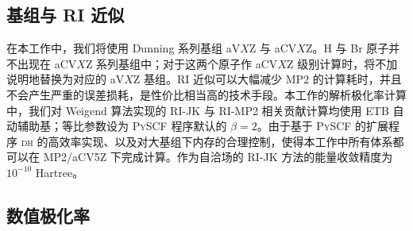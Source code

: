 \subsection{基组与 RI 近似}

在本工作中，我们将使用 Dunning 系列基组 aV$X$Z 与 aCV$X$Z。H 与 Br 原子并不出现在 aCV$X$Z 系列基组中；对于这两个原子作 aCV$X$Z 级别计算时，将不加说明地替换为对应的 aV$X$Z 基组。RI 近似可以大幅减少 MP2 的计算耗时，并且不会产生严重的误差损耗，是性价比相当高的技术手段\cite{Vahtras-Feyereisen.CPL.1993}。本工作的解析极化率计算中，我们对 Weigend 算法实现的 RI-JK\cite{Weigend-Weigend.PCCP.2002} 与 RI-MP2 相关贡献\cite{Weigend-Haettig.JCP.2002}计算均使用 ETB 自动辅助基；等比参数设为 \textsc{PySCF} 程序默认的 $\beta = 2$。由于基于 \textsc{PySCF} 的扩展程序 \textsc{dh} 的高效率实现、以及对大基组下内存的合理控制，使得本工作中所有体系都可以在 MP2/aCV5Z 下完成计算。作为自洽场的 RI-JK 方法的能量收敛精度为 $10^{-10}$ Hartree。

\subsection{数值极化率}


